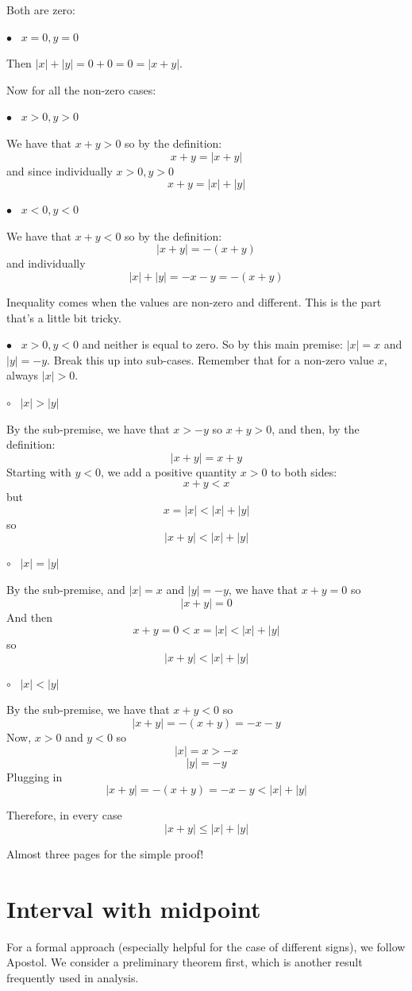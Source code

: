 \documentclass[11pt, oneside]{article}
\begin{document}
Both are zero:

$\bullet$ \ $x = 0, y = 0$

Then $|x| + |y| = 0 + 0 = 0 = |x + y|$.

Now for all the non-zero cases:

$\bullet$ \ $x > 0, y > 0$

We have that $x + y > 0$ so by the definition:
\[ x + y = |x + y| \]
and since individually $x > 0, y > 0$
\[ x + y = |x| + |y| \]

$\bullet$ \ $x < 0, y < 0$

We have that $x + y < 0$ so by the definition:
\[ |x + y| = - (x + y) \]
and individually
\[ |x| + |y| = - x - y = - (x + y) \]

Inequality comes when the values are non-zero and different.  This is the part that's a little bit tricky.

$\bullet$ \ $x > 0, y < 0$ and neither is equal to zero.  So by this main premise:  $|x| = x$ and $|y| = - y$.  Break this up into sub-cases.  Remember that for a non-zero value $x$, always $|x| > 0$.

$\circ$ \ $|x| > |y|$

By the sub-premise, we have that $x > -y$ so $x + y > 0$, and then, by the definition:
\[ |x + y| = x + y \]
Starting with $y < 0$, we add a positive quantity $x > 0$ to both sides:
\[ x + y < x \]
but
\[ x = |x| < |x| + |y| \]
so
\[ |x + y| <  |x| + |y| \]

$\circ$ \ $|x| = |y|$

By the sub-premise, and $|x| = x$ and $|y| = - y$, we have that $x + y = 0$ so
\[ |x + y| = 0 \]
And then
\[ x + y = 0 < x = |x| < |x| + |y| \]
so
\[ |x + y| <  |x| + |y| \]

$\circ$ \ $|x| < |y|$

By the sub-premise, we have that $x + y < 0$ so
\[ |x + y| = -(x + y) = - x - y \]
Now, $x > 0$ and $y < 0$ so
\[ |x| = x > -x \]
\[ |y| = -y \]
Plugging in
\[ |x + y| = -(x + y) = - x - y < |x| + |y| \]

Therefore, in every case
\[ |x + y| \le |x| + |y| \]

Almost three pages for the simple proof!

\section{Interval with midpoint}

For a formal approach (especially helpful for the case of different signs), we follow Apostol.  We consider a preliminary theorem first, which is another result frequently used in analysis.
\end{document}
